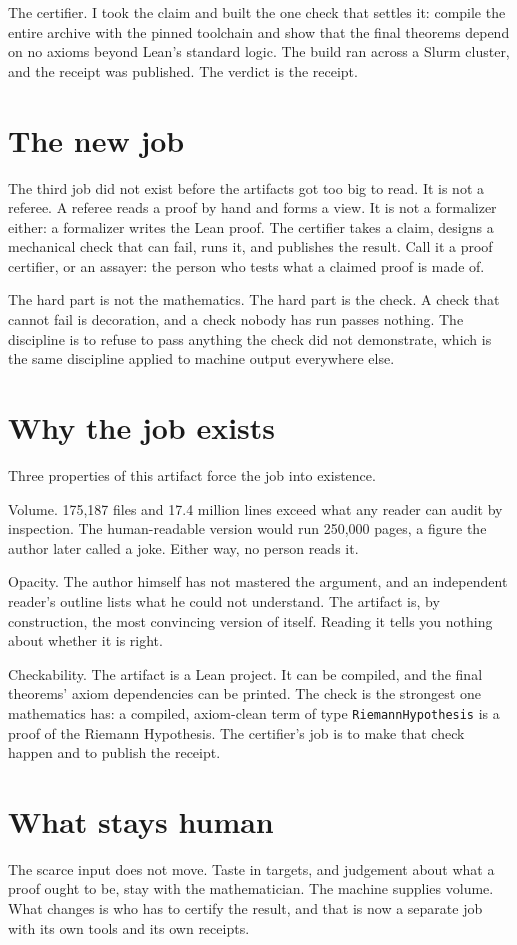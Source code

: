 \documentclass[11pt]{article}
\begin{document}
The certifier. I took the claim and built the one check that settles it: compile the entire archive with the pinned toolchain and show that the final theorems depend on no axioms beyond Lean's standard logic. The build ran across a Slurm cluster, and the receipt was published. The verdict is the receipt.

\section{The new job}
The third job did not exist before the artifacts got too big to read. It is not a referee. A referee reads a proof by hand and forms a view. It is not a formalizer either: a formalizer writes the Lean proof. The certifier takes a claim, designs a mechanical check that can fail, runs it, and publishes the result. Call it a proof certifier, or an assayer: the person who tests what a claimed proof is made of.

The hard part is not the mathematics. The hard part is the check. A check that cannot fail is decoration, and a check nobody has run passes nothing. The discipline is to refuse to pass anything the check did not demonstrate, which is the same discipline applied to machine output everywhere else.

\section{Why the job exists}
Three properties of this artifact force the job into existence.

Volume. 175,187 files and 17.4 million lines exceed what any reader can audit by inspection. The human-readable version would run 250,000 pages, a figure the author later called a joke. Either way, no person reads it.

Opacity. The author himself has not mastered the argument, and an independent reader's outline lists what he could not understand. The artifact is, by construction, the most convincing version of itself. Reading it tells you nothing about whether it is right.

Checkability. The artifact is a Lean project. It can be compiled, and the final theorems' axiom dependencies can be printed. The check is the strongest one mathematics has: a compiled, axiom-clean term of type \texttt{RiemannHypothesis} is a proof of the Riemann Hypothesis. The certifier's job is to make that check happen and to publish the receipt.

\section{What stays human}
The scarce input does not move. Taste in targets, and judgement about what a proof ought to be, stay with the mathematician. The machine supplies volume. What changes is who has to certify the result, and that is now a separate job with its own tools and its own receipts.
\end{document}
